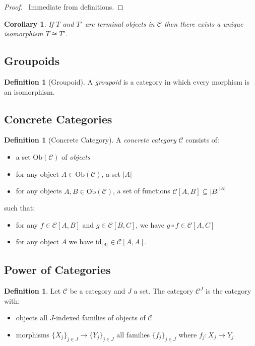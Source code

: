 \documentclass{book}
\let\qed\relax
\newtheorem{cor}{Corollary}[ax]
\theoremstyle{definition}
\newtheorem{df}[ax]{Definition}
\newcommand{\id}[1]{\ensuremath{\mathrm{id}_{#1}}}
\newcommand{\Ob}[1]{\ensuremath{\mathrm{Ob} \left( {#1} \right)}}
\begin{document}
\begin{proof}
\pf\ Immediate from definitions. \qed
\end{proof}

\begin{cor}
If $T$ and $T'$ are terminal objects in $\mathcal{C}$ then there exists a unique isomorphism $T \cong T'$.
\end{cor}

\subsection{Groupoids}

\begin{df}[Groupoid]
A \emph{groupoid} is a category in which every morphism is an isomorphism.
\end{df}

\subsection{Concrete Categories}

\begin{df}[Concrete Category]
A \emph{concrete category} $\mathcal{C}$ consists of:
\begin{itemize}
\item a set $\Ob{\mathcal{C}}$ of \emph{objects}
\item for any object $A \in \Ob{\mathcal{C}}$, a set $|A|$
\item for any objects $A,B \in \Ob{\mathcal{C}}$, a set of functions $\mathcal{C}[A,B] \subseteq |B|^{|A|}$
\end{itemize}
such that:
\begin{itemize}
\item for any $f \in \mathcal{C}[A,B]$ and $g \in \mathcal{C}[B,C]$, we have $g \circ f \in \mathcal{C}[A,C]$
\item for any object $A$ we have $\id{|A|} \in \mathcal{C}[A,A]$.
\end{itemize}
\end{df}

\subsection{Power of Categories}

\begin{df}
Let $\mathcal{C}$ be a category and $J$ a set. The category $\mathcal{C}^J$ is the category with:
\begin{itemize}
\item objects all $J$-indexed families of objects of $\mathcal{C}$
\item morphisms $\{X_j\}_{j \in J} \rightarrow \{Y_j\}_{j \in J}$ all families $\{f_j\}_{j \in J}$ where $f_j : X_j \rightarrow Y_j$
\end{itemize}
\end{df}
\end{document}
